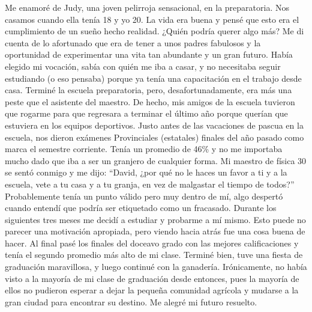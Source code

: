 \documentclass[twoside, 12pt]{book}
\begin{document}
Me enamoré de Judy, una joven pelirroja sensacional, en la preparatoria. Nos casamos cuando ella tenía 18 y yo 20. La vida era buena y pensé que esto era el cumplimiento de un sueño hecho realidad. ¿Quién podría querer algo más? Me di cuenta de lo afortunado que era de tener a unos padres fabulosos y la oportunidad de experimentar una vita tan abundante y un gran futuro. Había elegido mi vocación, sabía con quién me iba a casar, y no necesitaba seguir estudiando (o eso pensaba) porque ya tenía una capacitación en el trabajo desde casa. Terminé la escuela preparatoria, pero, desafortunadamente, era más una peste que el asistente del maestro. De hecho, mis amigos de la escuela tuvieron que rogarme para que regresara a terminar el último año porque querían que estuviera en los equipos deportivos. Justo antes de las vacaciones de pascua en la escuela, nos dieron exámenes Provinciales (estatales) finales del año pasado como marca el semestre corriente. Tenía un promedio de 46\% y no me importaba mucho dado que iba a ser un granjero de cualquier forma. Mi maestro de física 30 se sentó conmigo y me dijo: “David, ¿por qué no le haces un favor a ti y a la escuela, vete a tu casa y a tu granja, en vez de malgastar el tiempo de todos?” Probablemente tenía un punto válido pero muy dentro de mí, algo despertó cuando entendí que podría ser etiquetado como un fracasado. Durante los siguientes tres meses me decidí a estudiar y probarme a mí mismo. Esto puede no parecer una motivación apropiada, pero viendo hacia atrás fue una cosa buena de hacer. Al final pasé los finales del doceavo grado con las mejores calificaciones y tenía el segundo promedio más alto de mi clase. Terminé bien, tuve una fiesta de graduación maravillosa, y luego continué con la ganadería. Irónicamente, no había visto a la mayoría de mi clase de graduación desde entonces, pues la mayoría de ellos no pudieron esperar a dejar la pequeña comunidad agrícola y mudarse a la gran ciudad para encontrar su destino. Me alegré mi futuro resuelto.\\
\end{document}
